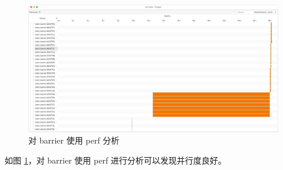 \documentclass[a4paper]{article}
\begin{document}
\begin{figure}[h]
  \centering
  \includegraphics[width=\textwidth]{barrier-perf.png}
  \caption{对 barrier 使用 perf 分析}
  \label{pic:perf}
\end{figure}

如图 \ref{pic:perf}，对 barrier 使用 perf 进行分析可以发现并行度良好。



% 
% 
\end{document}
